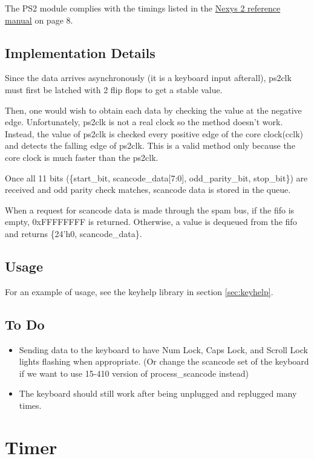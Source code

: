 \documentclass[10pt]{report}
\begin{document}
The PS2 module complies with the timings listed in the
\href{http://www.digilentinc.com/Data/Products/NEXYS2/Nexys2_rm.pdf}{Nexys 2
reference manual} on page 8.

\subsection{Implementation Details}

Since the data arrives asynchronously (it is a keyboard input afterall),
ps2clk must first be latched with 2 flip flops to get a stable value.

Then, one would wish to obtain each data by checking the value at the
negative edge. Unfortunately, ps2clk is not a real clock so the method
doesn't work. Instead, the value of ps2clk is checked every positive edge of
the core clock(cclk) and detects the falling edge of ps2clk. This is a valid
method only because the core clock is much faster than the ps2clk.

Once all 11 bits (\{start\_bit, scancode\_data[7:0], odd\_parity\_bit,
stop\_bit\}) are received and odd parity check matches, scancode data is
stored in the queue.

When a request for scancode data is made through the spam bus, if the fifo
is empty, 0xFFFFFFFF is returned. Otherwise, a value is dequeued from the
fifo and returns \{24'h0, scancode\_data\}.

\subsection{Usage}

For an example of usage, see the keyhelp library in section
\ref{sec:keyhelp}.

\subsection{To Do}

\begin{itemize}
\item{Sending data to the keyboard to have Num Lock, Caps Lock, and Scroll
Lock lights flashing when appropriate. (Or change the scancode set of the
keyboard if we want to use 15-410 version of process\_scancode instead)}
\item{The keyboard should still work after being unplugged and replugged
many times.}
\end{itemize}


\section{Timer}
\end{document}
